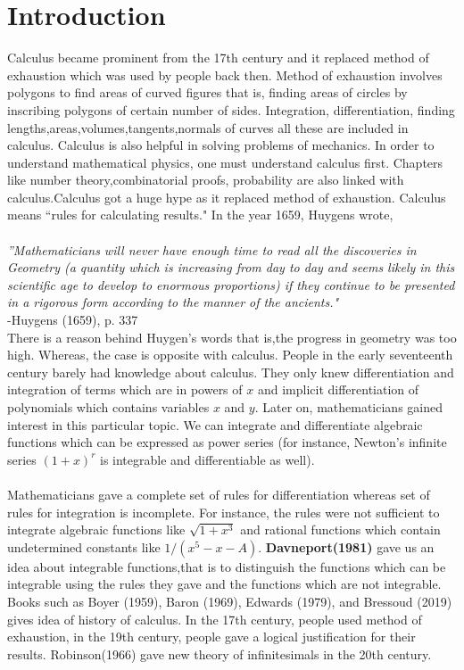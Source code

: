 \documentclass[a4paper,reqno,11pt]{book}
\theoremstyle{plain}%
\theoremstyle{definition}
\begin{document}
\section{Introduction}
Calculus became prominent from the 17th century and it replaced method of exhaustion which was used by people back then. Method of exhaustion involves polygons to find areas of curved figures that is, finding areas of circles by inscribing polygons of certain number of sides. Integration, differentiation, finding lengths,areas,volumes,tangents,normals of curves all these are included in calculus. Calculus is also helpful in solving problems of mechanics. In order to understand mathematical physics, one must understand calculus first. Chapters like number theory,combinatorial proofs, probability are also linked with calculus.Calculus got a huge hype as it replaced method of exhaustion. Calculus means ``rules for calculating results." In the year 1659, Huygens wrote,\\
\\
\textit{''Mathematicians will never have enough time to read all the
discoveries in Geometry (a quantity which is increasing from
day to day and seems likely in this scientific age to develop
to enormous proportions) if they continue to be presented in a
rigorous form according to the manner of the ancients."}\cite{ref 1}\\
\vspace{2ex}
\hfill{-Huygens (1659), p. 337}
\\
\indent There is a reason behind Huygen's words that is,the progress in geometry was too high. Whereas, the case is opposite with calculus. People in the early seventeenth century barely had knowledge about calculus. They only knew differentiation and integration of terms which are in powers of $x$ and implicit differentiation of polynomials which contains variables $x$
and $y$. Later on, mathematicians gained interest in this particular topic. We can integrate and differentiate algebraic functions which can be expressed as power series (for instance, Newton's infinite series $(1+x)^r$ is integrable and differentiable as well).\\
\\
\indent Mathematicians gave a complete set of rules for differentiation whereas set of rules for integration is incomplete. For instance, the rules were not sufficient to integrate algebraic functions like 
$\sqrt{1+x^3}$ and rational functions which contain undetermined constants
like $1/(x^5-x-A)$. \textbf{Davneport(1981)} gave us an idea about integrable functions,that is to distinguish the functions which can be integrable using the rules they gave and the functions which are not integrable. 
Books such as Boyer (1959), Baron (1969), Edwards (1979), and Bressoud
(2019) gives idea of history of calculus. In the 17th century, people used method of exhaustion, in the 19th century, people gave a logical justification for their results. Robinson(1966) gave new theory of infinitesimals in the 20th century.\\
\\
\end{document}
